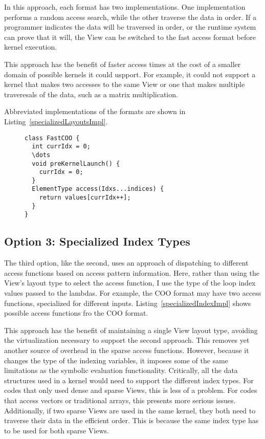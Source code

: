 In this approach, each format has two implementations. 
One implementation performs a random access search, while the other traverse the data in order. 
If a programmer indicates the data will be traversed in order, or the runtime system can prove that it will, the View can be switched to the fast access format before kernel execution.

This approach has the benefit of faster access times at the cost of a smaller domain of possible kernels it could uspport. 
For example, it could not support a kernel that makes two accesses to the same View or one that makes multiple traveresals of the data, such as a matrix multiplication.

Abbreviated implementations of the formats are shown in Listing~\ref{specializedLayoutsImpl}.
\begin{figure}
\begin{lstlisting}[caption={Abbreviated format implementation for the Specialized Traversal Layout approach.},label=specializedLayoutsImpl]
class FastCOO {
  int currIdx = 0;
  \dots
  void preKernelLaunch() {
    currIdx = 0;
  }
  ElementType access(Idxs...indices) {
    return values[currIdx++];
  }
}
\end{lstlisting}
\end{figure}

\subsection{Option 3: Specialized Index Types}
The third option, like the second, uses an approach of dispatching to different access functions based on access pattern information.
Here, rather than using the View's layout type to select the access function, I use the type of the loop index values passed to the lambdas.
For example, the COO format may have two access functions, specialized for different inputs.
Listing~\ref{specializedIndexImpl} shows possible access functions fro the COO format.

This approach has the benefit of maintaining a single View layout type, avoiding the virtualization necessary to support the second approach.
This removes yet another source of overhead in the sparse access functions.
However, because it changes the type of the indexing variables, it imposes some of the same limitations as the symbolic evaluation functionality. 
Critically, all the data structures used in a kernel would need to support the different index types. 
For codes that only used dense and sparse Views, this is less of a problem.
For codes that access vectors or traditional arrays, this presents more serious issues.
Additionally, if two sparse Views are used in the same kernel, they both need to traverse their data in the efficient order.
This is because the same index type has to be used for both sparse Views.


